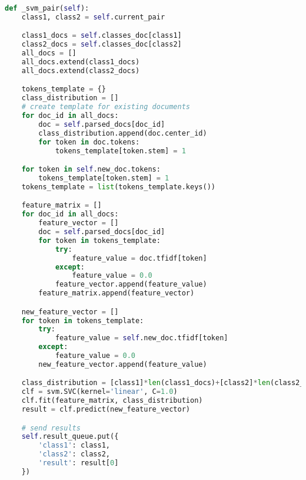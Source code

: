 \begin{lstlisting}[language=Python, caption={SVM.\_svm\_pair() - SVM class process main method}, label={lst:svm:svm}]
def _svm_pair(self):
    class1, class2 = self.current_pair

    class1_docs = self.classes_doc[class1]
    class2_docs = self.classes_doc[class2]
    all_docs = []
    all_docs.extend(class1_docs)
    all_docs.extend(class2_docs)

    tokens_template = {}
    class_distribution = []
    # create template for existing documents
    for doc_id in all_docs:
        doc = self.parsed_docs[doc_id]
        class_distribution.append(doc.center_id)
        for token in doc.tokens:
            tokens_template[token.stem] = 1

    for token in self.new_doc.tokens:
        tokens_template[token.stem] = 1
    tokens_template = list(tokens_template.keys())

    feature_matrix = []
    for doc_id in all_docs:
        feature_vector = []
        doc = self.parsed_docs[doc_id]
        for token in tokens_template:
            try:
                feature_value = doc.tfidf[token]
            except:
                feature_value = 0.0
            feature_vector.append(feature_value)
        feature_matrix.append(feature_vector)

    new_feature_vector = []
    for token in tokens_template:
        try:
            feature_value = self.new_doc.tfidf[token]
        except:
            feature_value = 0.0
        new_feature_vector.append(feature_value)

    class_distribution = [class1]*len(class1_docs)+[class2]*len(class2_docs)
    clf = svm.SVC(kernel='linear', C=1.0)
    clf.fit(feature_matrix, class_distribution)
    result = clf.predict(new_feature_vector)

    # send results
    self.result_queue.put({
        'class1': class1,
        'class2': class2,
        'result': result[0]
    })
\end{lstlisting}
